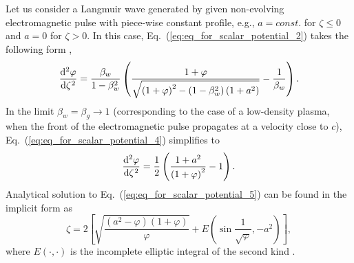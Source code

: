 \documentclass[10pt, a4paper, twoside, openright]{report}
\begin{document}
Let us consider a Langmuir wave generated by given non-evolving electromagnetic pulse with piece-wise constant profile,  e.g., $ a = const. $ for $ \zeta \leq 0 $ and $ a = 0 $ for $ \zeta > 0 $. In this case, Eq.~(\ref{eq:eq_for_scalar_potential_2}) takes the following form \cite{Bulanov2016, Bulanov2021},
\begin{equation}\label{eq:eq_for_scalar_potential_4}
\diff[2]{\varphi}{\zeta} = \frac{\beta_w}{1 - \beta_w^2} \left( \frac{1 + \varphi}{\sqrt{\left( 1 + \varphi \right)^2 - \left( 1 - \beta_w^2 \right) \left( 1 + a^2 \right)}} - \frac{1}{\beta_w} \right).
\end{equation}
In the limit $ \beta_w = \beta_g \rightarrow 1 $ (corresponding to the case of a low-density plasma, when the front of the electromagnetic pulse propagates at a velocity close to $ c $), Eq.~(\ref{eq:eq_for_scalar_potential_4}) simplifies to \cite{Bulanov1989, Berezhiani1990, Esarey2009, Bulanov2016, Bulanov2021}
\begin{equation}\label{eq:eq_for_scalar_potential_5}
\diff[2]{\varphi}{\zeta} = \frac{1}{2} \left( \frac{1 + a^2}{\left( 1 + \varphi \right)^2} - 1 \right).
\end{equation}
Analytical solution to Eq.~(\ref{eq:eq_for_scalar_potential_5}) can be found in the implicit form as \cite{Bulanov1989, Berezhiani1990, Bulanov2016, Bulanov2021}
\begin{equation}\label{eq:analytical_solution}
\zeta = 2 \left[ \sqrt{\frac{\left( a^2 - \varphi \right) \left( 1 + \varphi \right)}{\varphi}} + E \left( \sin \frac{1}{\sqrt{\varphi}}, -a^2 \right) \right],
\end{equation}
where $ E \left( \cdot, \cdot \right) $ is the incomplete elliptic integral of the second kind \cite{Gradshteyn1965}. 
\end{document}
